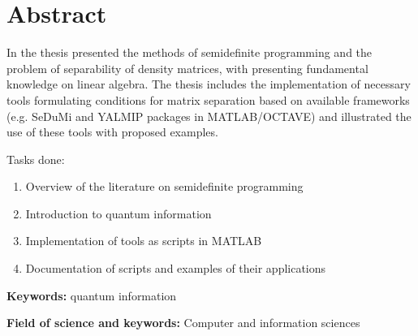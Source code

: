 \section*{Abstract}

In the thesis presented the methods of semidefinite programming and the problem of separability of density matrices, with presenting fundamental knowledge on linear algebra. The thesis includes the implementation of necessary tools formulating conditions for matrix separation based on available frameworks (e.g. SeDuMi and YALMIP packages in MATLAB/OCTAVE) and illustrated the use of these tools with proposed examples.

Tasks done:

\begin{enumerate}
    \item Overview of the literature on semidefinite programming
    \item Introduction to quantum information
    \item Implementation of tools as scripts in MATLAB
    \item Documentation of scripts and examples of their applications
\end{enumerate}

\noindent \textbf{Keywords:} quantum information

\noindent \textbf{Field of science and keywords:} Computer and information sciences
